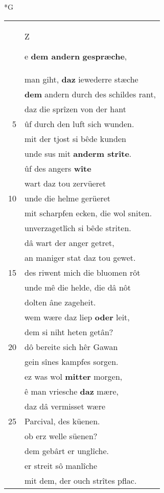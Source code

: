 \documentclass[8pt,a4paper,notitlepage]{article}
\begin{document}
\begin{table}[ht]
\begin{minipage}[t]{0.5\linewidth}
\small
\begin{center}*G
\end{center}
\begin{tabular}{rl}
 & \begin{large}Z\end{large}e \textbf{dem andern} \textbf{gespræche},\\ 
 & man giht, \textbf{daz} iewederre stæche\\ 
 & \textbf{dem} andern durch des schildes rant,\\ 
 & daz die sprîzen von der hant\\ 
5 & ûf durch den luft sich wunden.\\ 
 & mit der tjost si bêde kunden\\ 
 & unde sus mit \textbf{anderm strîte}.\\ 
 & ûf des angers \textbf{wîte}\\ 
 & wart daz tou zervüeret\\ 
10 & unde die helme gerüeret\\ 
 & mit scharpfen ecken, die wol sniten.\\ 
 & unverzagetlîch si bêde striten.\\ 
 & dâ wart der anger getret,\\ 
 & an maniger stat daz tou gewet.\\ 
15 & des riwent mich die bluomen rôt\\ 
 & unde mê die helde, die dâ nôt\\ 
 & dolten âne zageheit.\\ 
 & wem wære daz liep \textbf{oder} leit,\\ 
 & dem si niht heten getân?\\ 
20 & dô bereite sich hêr Gawan\\ 
 & gein sînes kampfes sorgen.\\ 
 & ez was wol \textbf{mitter} morgen,\\ 
 & ê man vriesche \textbf{daz} mære,\\ 
 & daz dâ vermisset wære\\ 
25 & Parcival, des küenen.\\ 
 & ob erz welle süenen?\\ 
 & dem gebârt er unglîche.\\ 
 & er streit sô manlîche\\ 
 & mit dem, der ouch strîtes pflac.\\ 

\end{tabular}
\end{minipage}
\end{table}
\end{document}

